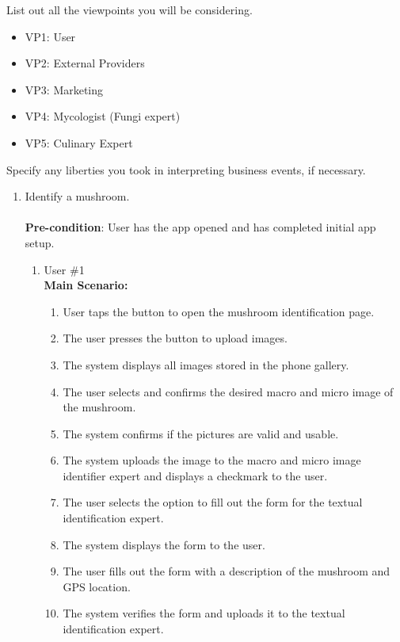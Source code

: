 \documentclass[]{article}
\begin{document}
 List out all the viewpoints you will be considering.\\

\begin{itemize}
	\item VP1: User
	\item VP2: External Providers
	\item VP3: Marketing
	\item VP4: Mycologist (Fungi expert)
	\item VP5: Culinary Expert
\end{itemize}

 Specify any liberties you took in interpreting business events, if necessary.\\

\begin{enumerate}[{\bf BE1.}]
	\item Identify a mushroom. \\
	\\
	\textbf{Pre-condition}: User has the app opened and has completed initial app setup. 
		\begin{enumerate}[{\bf VP1.}]
			\item User \#1 \\
				\textbf{Main Scenario:}
				\begin{enumerate}[1.]
					\item User taps the button to open the mushroom identification page.
					\item The user presses the button to upload images.
					\item The system displays all images stored in the phone gallery.
					\item The user selects and confirms the desired macro and micro image of the mushroom.
					\item The system confirms if the pictures are valid and usable.
					\item The system uploads the image to the macro and micro image identifier expert and displays a checkmark to the user.
					\item The user selects the option to fill out the form for the textual identification expert. 
					\item The system displays the form to the user.
					\item The user fills out the form with a description of the mushroom and GPS location.
					\item The system verifies the form and uploads it to the textual identification expert.

\end{enumerate}
\end{enumerate}
\end{enumerate}
\end{document}
